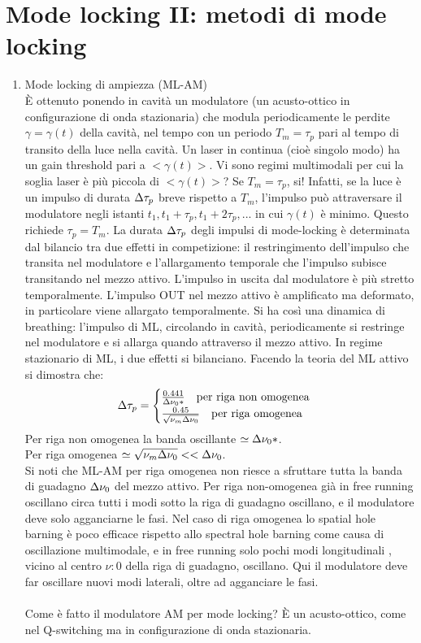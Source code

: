 \section{Mode locking II: metodi di mode locking}
\begin{enumerate}
\item Mode locking di ampiezza (ML-AM)\\
È ottenuto ponendo in cavità un modulatore (un acusto-ottico in configurazione di onda stazionaria) che modula periodicamente le perdite $\gamma = \gamma(t)$ della cavità, nel tempo con un periodo $T_m = \tau_p$ pari al tempo di transito della luce nella cavità.
Un laser in continua (cioè singolo modo) ha un gain threshold pari a $<\gamma(t)>$. Vi sono regimi multimodali per cui la soglia laser è più piccola di $<\gamma(t)>$?
Se $T_m = \tau_p$, si! Infatti, se la luce è un impulso di durata $\Delta\tau_p$ breve rispetto a $T_m$, l'impulso può attraversare il modulatore negli istanti $t_1, t_1 +\tau_p, t_1 +2\tau_p, ...$ in cui $\gamma(t)$ è minimo.
Questo richiede $\tau_p = T_m$.
La durata $\Delta\tau_p$ degli impulsi di mode-locking è determinata dal bilancio tra due effetti in competizione:
il restringimento dell'impulso che transita nel modulatore e l'allargamento temporale che l'impulso subisce transitando nel mezzo attivo.
L'impulso in uscita dal modulatore è più stretto temporalmente.
L'impulso OUT nel mezzo attivo è amplificato ma deformato, in particolare viene allargato temporalmente.
Si ha così una dinamica di breathing: l'impulso di ML, circolando in cavità, periodicamente si restringe nel modulatore e si allarga quando attraverso il mezzo attivo. In regime stazionario di ML, i due effetti si bilanciano. Facendo la teoria del ML attivo si dimostra che:
\begin{equation*}
\Delta\tau_p = \begin{cases}
\frac{0.441}{\Delta\nu_0*} \quad \text{per riga non omogenea}\\
\frac{0.45}{\sqrt{\nu_m\Delta\nu_0}} \quad \text{per riga omogenea}
\end{cases}
\end{equation*}
Per riga non omogenea la banda oscillante $\simeq \Delta\nu_0*$.\\
Per riga omogenea $\simeq \sqrt{\nu_m\Delta\nu_0} << \Delta\nu_0$.\\
Si noti che ML-AM per riga omogenea non riesce a sfruttare tutta la banda di guadagno $\Delta\nu_0$ del mezzo attivo. Per riga non-omogenea già in free running oscillano circa tutti i modi sotto la riga di guadagno oscillano, e il modulatore deve solo agganciarne le fasi. Nel caso di riga omogenea lo spatial hole barning è poco efficace rispetto allo spectral hole barning come causa di oscillazione multimodale, e in free running solo pochi modi longitudinali , vicino al centro $\nu:0$ della riga di guadagno, oscillano. Qui il modulatore deve far oscillare nuovi modi laterali, oltre ad agganciare le fasi.\\
\\
Come è fatto il modulatore AM per mode locking?
È un acusto-ottico, come nel Q-switching ma in configurazione di onda stazionaria.


\end{enumerate}
